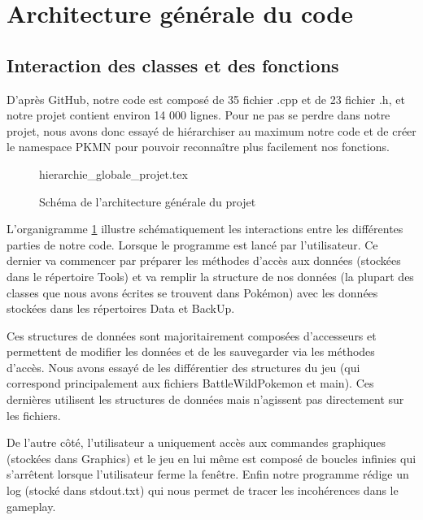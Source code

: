 \section{Architecture générale du code}

\subsection{Interaction des classes et des fonctions}
D'après GitHub, notre code est composé de 35 fichier .cpp et de 23 fichier .h, et notre projet contient environ 14 000 lignes. Pour ne pas se perdre dans notre projet, nous avons donc essayé de hiérarchiser au maximum notre code et de créer le namespace PKMN pour pouvoir reconnaître plus facilement nos fonctions. 

\begin{figure}[!h]\centering
{hierarchie_globale_projet.tex}
\caption{\label{ArchiGenerale}Schéma de l'architecture générale du projet}
\end{figure}

L'organigramme \ref{ArchiGenerale} illustre schématiquement les interactions entre les différentes parties de notre code. Lorsque le programme est lancé par l'utilisateur. Ce dernier va commencer par préparer les méthodes d'accès aux données (stockées dans le répertoire Tools) et va remplir la structure de nos données (la plupart des classes que nous avons écrites se trouvent dans Pokémon) avec les données stockées dans les répertoires Data et BackUp. 

Ces structures de données sont majoritairement composées d'accesseurs et permettent de modifier les données et de les sauvegarder via les méthodes d'accès. Nous avons essayé de les différentier des structures du jeu (qui correspond principalement aux fichiers BattleWildPokemon et main). Ces dernières utilisent les structures de données mais n'agissent pas directement sur les fichiers. 

De l'autre côté, l'utilisateur a uniquement accès aux commandes graphiques (stockées dans Graphics) et le jeu en lui même est composé de boucles infinies qui s'arrêtent lorsque l'utilisateur ferme la fenêtre.
Enfin notre programme rédige un log (stocké dans stdout.txt) qui nous permet de tracer les incohérences dans le gameplay. 

